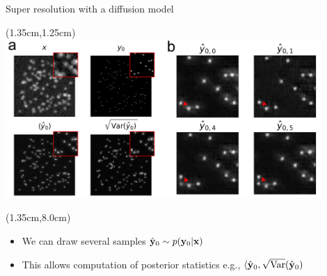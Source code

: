 \documentclass{beamer}					%
\begin{document}

\begin{frame}{Super resolution with a diffusion model}
\begin{textblock*}{12cm}(1.35cm,1.25cm)
\includegraphics[width=12cm]{../../phd/ddpm/ddpm/media/Figure-2-1-crop.png}
\end{textblock*}
\begin{textblock*}{12cm}(1.35cm,8.0cm)
\begin{itemize}
\item We can draw several samples $\hat{\bold{y}}_{0} \sim p(\bold{y}_{0}\lvert \bold{x})$
\item This allows computation of posterior statistics e.g., $\langle \hat{\bold{y}}_{0}, \sqrt{\mathrm{Var}}(\hat{\bold{y}}_{0})$
\end{itemize}
\end{textblock*}
\end{frame}
\end{document}
